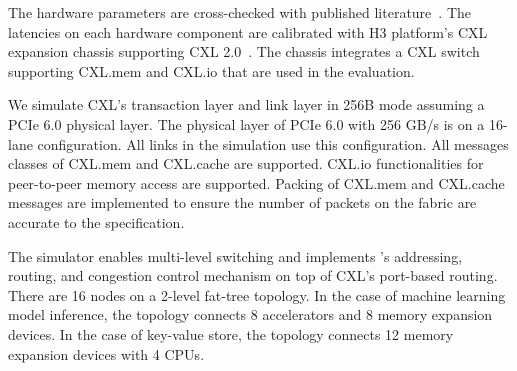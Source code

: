 The hardware parameters are cross-checked with published literature~\cite{pond:asplos:2023, demystifying-cxl:micro:2023, h3platform-cxl-memory}. 
%
The latencies on each hardware component are calibrated with H3 platform's CXL expansion chassis supporting CXL 2.0~\cite{h3platform-cxl-memory}. 
%
The chassis integrates a CXL switch~\cite{xconn-cxl2-switch} supporting CXL.mem and CXL.io that are used in the evaluation.

We simulate CXL's transaction layer and link layer in 256B mode assuming a PCIe 6.0 physical layer.
%
The physical layer of PCIe 6.0 with 256 GB/s is on a 16-lane configuration. 
%
All links in the simulation use this configuration.
%
All messages classes of CXL.mem and CXL.cache are supported.  
%
CXL.io functionalities for peer-to-peer memory access are supported. 
%
Packing of CXL.mem and CXL.cache messages are implemented to ensure the number of packets on the fabric are accurate to the specification.

The simulator enables multi-level switching and implements \aurelia's addressing, routing, and congestion control mechanism on top of CXL's port-based routing.
%
There are 16 nodes on a 2-level fat-tree topology. 
%
In the case of machine learning model inference, the topology connects 8 accelerators and 8 memory expansion devices.
%
In the case of key-value store, the topology connects 12 memory expansion devices with 4 CPUs.
  
%
